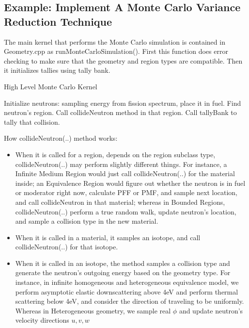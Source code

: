 \documentclass[titlepage]{article}
\begin{document}
\clearpage
\subsection{Example: Implement A Monte Carlo Variance Reduction Technique}
The main kernel that performs the Monte Carlo simulation is contained in Geometry.cpp as runMonteCarloSimulation(). First this function does error checking to make sure that the geometry and region types are compatible. Then it initializes tallies using tally bank.

\begin{algorithm}

\caption{High Level Monte Carlo Kernel}
\begin{algorithmic}
\STATE Initialize neutrons: sampling energy from fission spectrum, place it in fuel. 
\STATE Find neutron's region. 
\STATE Call collideNeutron method in that region. 
\STATE Call tallyBank to tally that collision. 
\ENDWHILE
\ENDFOR
\ENDFOR
\ENDWHILE
\end{algorithmic}
\end{algorithm}
How collideNeutron(..) method works:
\begin{itemize}
\item When it is called for a region, depends on the region subclass type, collideNeutron(..) may perform slightly different things. For instance, a Infinite Medium Region would just call collideNeutron(..) for the material inside; an Equivalence Region would figure out whether the neutron is in fuel or moderator right now, calculate PFF or PMF, and sample next location, and call collideNeutron in that material; whereas in Bounded Regions, collideNeutron(..) perform a true random walk, update neutron's location, and sample a collision type in the new material. 

\item When it is called in a material, it samples an isotope, and call collideNeutron(..) for that isotope. 

\item When it is called in an isotope, the method samples a collision type and generate the neutron's outgoing energy based on the geometry type. For instance, in infinite homogeneous and heterogeneous equivalence model, we perform asymptotic elastic downscattering above 4eV and perform thermal scattering below 4eV, and consider the direction of traveling to be uniformly. Whereas in Heterogeneous geometry, we sample real $\phi$ and update neutron's velocity directions $u,v,w$

\end{itemize}
\end{document}
